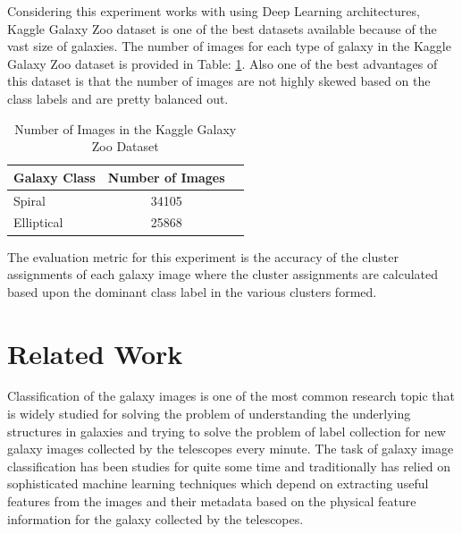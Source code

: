\documentclass{article}
\begin{document}
Considering this experiment works with using Deep Learning architectures, Kaggle Galaxy Zoo dataset is one of the best datasets available because of the vast size of galaxies. The number of images for each type of galaxy in the Kaggle Galaxy Zoo dataset is provided in Table: \ref{image_numbers}. Also one of the best advantages of this dataset is that the number of images are not highly skewed based on the class labels and are pretty balanced out.

\begin{table}[ht]
\caption{Number of Images in the Kaggle Galaxy Zoo Dataset}
\label{image_numbers}
\vskip 0.15in
\begin{center}
\begin{small}
\begin{sc}
\begin{tabular}{lcr}
\toprule
Galaxy Class & Number of Images \\
\midrule
Spiral    & 34105 \\
Elliptical & 25868\\
\bottomrule
\end{tabular}
\end{sc}
\end{small}
\end{center}
\vskip -0.1in
\end{table}


The evaluation metric for this experiment is the accuracy of the cluster assignments of each galaxy image where the cluster assignments are calculated based upon the dominant class label in the various clusters formed.













\section{Related Work}

Classification of the galaxy images is one of the most common research topic that is widely studied for solving the problem of understanding the underlying structures in galaxies and trying to solve the problem of label collection for new galaxy images collected by the telescopes every minute. The task of galaxy image classification has been studies for quite some time and traditionally has relied on sophisticated machine learning techniques which depend on extracting useful features from the images and their metadata based on the physical feature information for the galaxy collected by the telescopes. 
\end{document}

